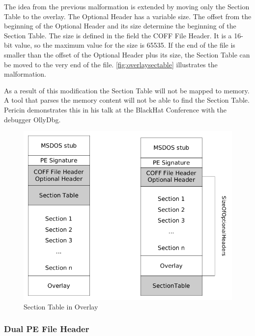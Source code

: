 The idea from the previous malformation is extended by moving only the Section Table to the overlay. The Optional Header has a variable size. The offset from the beginning of the Optional Header and its size determine the beginning of the Section Table. The size is defined in the field  the COFF File Header. It is a 16-bit value, so the maximum value for the size is 65535. If the end of the file is smaller than the offset of the Optional Header plus its size, the Section Table can be moved to the very end of the file. \autoref{fig:overlaysectable} illustrates the malformation.

As a result of this modification the Section Table will not be mapped to memory. A tool that parses the memory content will not be able to find the Section Table. Pericin demonstrates this in his talk at the BlackHat Conference with the debugger OllyDbg. \cite[min.\thinspace{}14:45]{vuksan11} 

\begin{figure}
\includegraphics[width=.98\textwidth, height=.60\textheight,keepaspectratio]{graphics/overlaysectable}
\caption{Section Table in Overlay }
\label{fig:overlaysectable} 
\end{figure}

\subsubsection*{Dual PE File Header} \label{subsubsec:dualheader}

